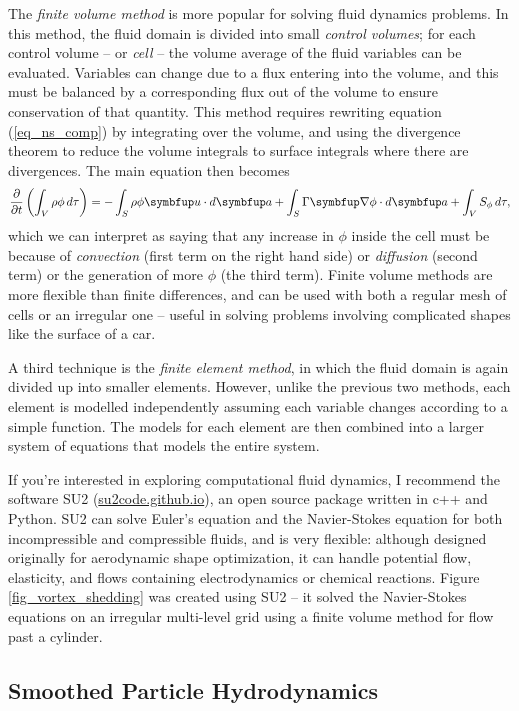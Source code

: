 The \emph{finite volume method} is more popular for solving fluid dynamics problems.  In this method, the fluid domain is divided into small \emph{control volumes}; for each control volume -- or \emph{cell} -- the volume average of the fluid variables can be evaluated.  Variables can change due to a flux entering into the volume, and this must be balanced by a corresponding flux out of the volume to ensure conservation of that quantity.  This method requires rewriting equation (\ref{eq_ns_comp}) by integrating over the volume, and using the divergence theorem to reduce the volume integrals to surface integrals where there are divergences.  The main equation then becomes
\[
\dfdx{}{t} \left( \int_V \rho \phi \, d\tau \right) =- \int_S \rho \phi \vec{u} \cdot d\vec{a} + \int_S \Gamma \grad \phi \cdot d\vec{a} + \int_V S_\phi \, d\tau,
\]
which we can interpret as saying that any increase in $\phi$ inside the cell must be because of \emph{convection} (first term on the right hand side) or \emph{diffusion} (second term) or the generation of more $\phi$ (the third term).  Finite volume methods are more flexible than finite differences, and can be used with both a regular mesh of cells or an irregular one -- useful in solving problems involving complicated shapes like the surface of a car. 

A third technique is the \emph{finite element method}, in which the fluid domain is again divided up into smaller elements.   However, unlike the previous two methods, each element is modelled independently assuming each variable changes according to a simple function.  The models for each element are then combined into a larger system of equations that models the entire system.

If you're interested in exploring computational fluid dynamics, I recommend the software SU2 (\url{su2code.github.io}), an open source package written in c++ and Python.  SU2 can solve Euler's equation and the Navier-Stokes equation for both incompressible and compressible fluids, and is very flexible:  although designed originally for aerodynamic shape optimization, it can handle potential flow, elasticity, and flows containing electrodynamics or chemical reactions.  Figure \ref{fig_vortex_shedding} was created using SU2 -- it solved the Navier-Stokes equations on an irregular multi-level grid using a finite volume method for flow past a cylinder.

\subsection{Smoothed Particle Hydrodynamics}

